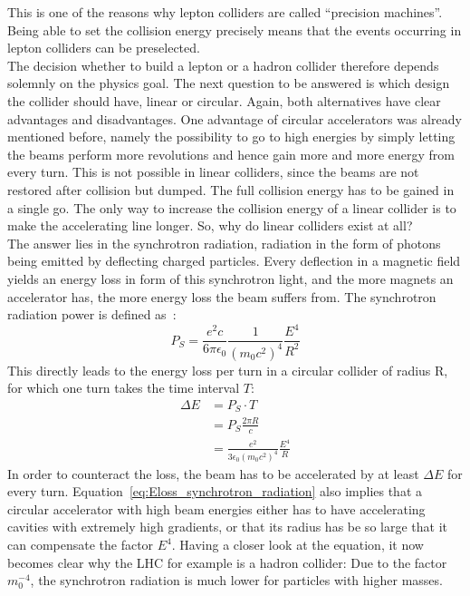 This is one of the reasons why lepton colliders are called ``precision machines''.
Being able to set the collision energy precisely means that the events occurring in lepton colliders can be preselected.\\
The decision whether to build a lepton or a hadron collider therefore depends solemnly on the physics goal.
The next question to be answered is which design the collider should have, linear or circular.
Again, both alternatives have clear advantages and disadvantages.
One advantage of circular accelerators was already mentioned before, namely the possibility to go to high energies by simply letting the beams perform more revolutions and hence gain more and more energy from every turn.
This is not possible in linear colliders, since the beams are not restored after collision but dumped.
The full collision energy has to be gained in a single go.
The only way to increase the collision energy of a linear collider is to make the accelerating line longer. So, why do linear colliders exist at all?\\
The answer lies in the synchrotron radiation, radiation in the form of photons being emitted by deflecting charged particles.
Every deflection in a magnetic field yields an energy loss in form of this synchrotron light, and the more magnets an accelerator has, the more energy loss the beam suffers from.
The synchrotron radiation power is defined as~\cite[p. 33]{Wille}:
\begin{equation}
 P_S = \frac{e^2c}{6\pi\epsilon_0}\frac{1}{(m_0c^2)^4}\frac{E^4}{R^2}
\end{equation}
This directly leads to the energy loss per turn in a circular collider of radius R, for which one turn takes the time interval $T$:
\begin{align}
 \Delta E &= P_S\cdot T\\
 &= P_S\frac{2\pi R}{c}\\
 &=\frac{e^2}{3\epsilon_0(m_0c^2)^4}\frac{E^4}{R} \label{eq:Eloss_synchrotron_radiation}
\end{align}
In order to counteract the loss, the beam has to be accelerated by at least $\Delta E$ for every turn.
Equation~\ref{eq:Eloss_synchrotron_radiation} also implies that a circular accelerator with high beam energies either has to have accelerating cavities with extremely high gradients, or that its radius has be so large that it can compensate the factor $E^4$.
Having a closer look at the equation, it now becomes clear why the LHC for example is a hadron collider:
Due to the factor $m_0^{-4}$, the synchrotron radiation is much lower for particles with higher masses.
